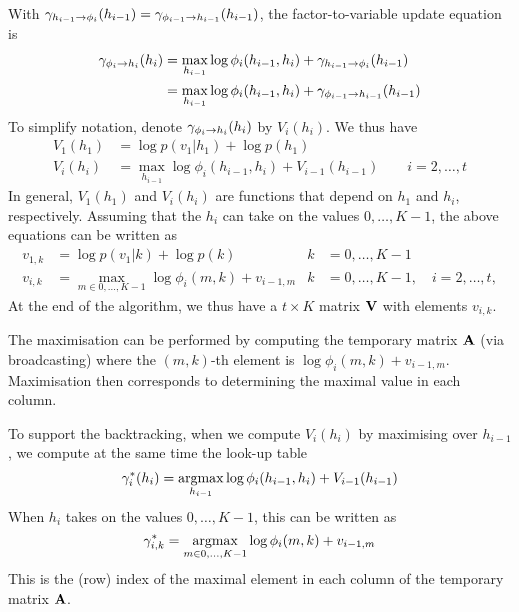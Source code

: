 \begin{solution}
\begin{center}
{}
 \end{center}

 With $\mxfmess{h_{i-1}}{\phi_i}{1}(h_{i-1})=\mfxmess{\phi_{i-1}}{h_{i-1}}{1}(h_{i-1})$, the factor-to-variable update equation is
 \begin{align}
   \mfxmess{\phi_i}{h_i}{1}(h_i) &= \max_{h_{i-1}} \log \phi_i(h_{i-1}, h_i) + \mxfmess{h_{i-1}}{\phi_i}{1}(h_{i-1})\\
   &= \max_{h_{i-1}} \log \phi_i(h_{i-1}, h_i) + \mfxmess{\phi_{i-1}}{h_{i-1}}{1}(h_{i-1})
 \end{align}
 To simplify notation, denote $\mfxmess{\phi_i}{h_i}{1}(h_i)$ by $V_i(h_i)$. We thus have
 \begin{align}
   V_1(h_1) & = \log p(v_1|h_1) + \log p(h_1) \\
   V_i(h_i) & =  \max_{h_{i-1}} \log \phi_i(h_{i-1}, h_i) + V_{i-1}(h_{i-1}) \quad \quad i=2, \ldots, t
 \end{align}
 In general, $V_1(h_1)$ and $V_i(h_i)$ are functions that depend on
 $h_1$ and $h_i$, respectively.  Assuming that the $h_i$ can take on
 the values $0, \ldots, K-1$, the above equations can be written as
\begin{align}
  v_{1,k} &= \log p(v_1|k) + \log p(k) &  k&=0, \ldots, K-1\\
  v_{i,k} & =  \max_{m \in{0, \ldots, K-1}} \log \phi_i(m, k) + v_{i-1,m} &  k&=0, \ldots, K-1, \quad i=2, \ldots, t,
 \end{align}
At the end of the algorithm, we thus have a $t \times K$ matrix $\mathbf{V}$
with elements $v_{i,k}$.

The maximisation can be performed by computing the temporary matrix
$\mathbf{A}$ (via broadcasting) where the $(m,k)$-th element is $\log
\phi_i(m, k) + v_{i-1,m}$. Maximisation then corresponds to
determining the maximal value in each column.

To support the backtracking, when we compute $V_i(h_i)$ by maximising
over $h_{i-1}$, we compute at the same time the look-up table
\begin{equation}
  \gamma_i^*(h_i)   =  \operatorname*{\mathrm{argmax}}_{h_{i-1}} \log \phi_i(h_{i-1}, h_i) + V_{i-1}(h_{i-1})
\end{equation}
When $h_i$ takes on the values $0, \ldots, K-1$, this can be written as
\begin{equation}
  \gamma^*_{i,k} = \operatorname*{\mathrm{argmax}}_{m \in{0, \ldots, K-1}} \log \phi_i(m, k) + v_{i-1,m}
\end{equation}
This is the (row) index of the maximal element in each column of the temporary matrix $\mathbf{A}$.


\end{solution}
